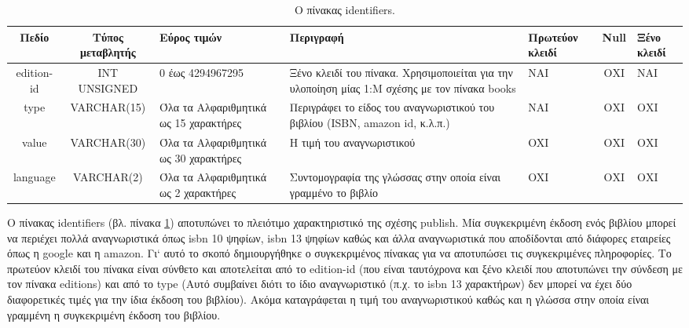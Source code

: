 \documentclass{assignment}
\begin{document}
\begin{landscape}
\begin{table}[htbp]
\begin{center}
  \begin{tabular}{|c|c|m{}|m{}|m{2.0cm}|c|m{1.5cm}|}
    \hline
    {\bf Πεδίο} & {\bf Τύπος μεταβλητής} & {\bf Εύρος τιμών} & {\bf Περιγραφή} & {\bf Πρωτεύον κλειδί} & {\bf Null} & {\bf Ξένο κλειδί} \\ \hline
    edition-id & INT UNSIGNED & 0 έως 4294967295 & Ξένο κλειδί του πίνακα. Χρησιμοποιείται για την υλοποίηση μίας 1:Μ σχέσης με τον πίνακα books & ΝΑΙ & ΟΧΙ & NAI \\ \hline
    type & VARCHAR(15) & Όλα τα Αλφαριθμητικά ως 15 χαρακτήρες & Περιγράφει το είδος του αναγνωριστικού του βιβλίου (ISBN, amazon id, κ.λ.π.)  & ΝΑΙ & ΟΧΙ & ΟΧΙ \\ \hline
    value & VARCHAR(30) & Όλα τα Αλφαριθμητικά ως 30 χαρακτήρες & Η τιμή του αναγνωριστικού  & OXI & ΟΧΙ & ΟΧΙ \\ \hline
    language & VARCHAR(2) & Όλα τα Αλφαριθμητικά ως 2 χαρακτήρες & Συντομογραφία της γλώσσας στην οποία είναι γραμμένο το βιβλίο  & OXI & ΟΧΙ & ΟΧΙ \\ \hline
  \end{tabular}
\caption{Ο πίνακας identifiers.}
\label{table:db_table:identifiers}
\end{center}
\end{table}

Ο πίνακας identifiers (βλ. πίνακα \ref{table:db_table:identifiers}) αποτυπώνει το πλειότιμο χαρακτηριστικό της σχέσης publish. Μία συγκεκριμένη έκδοση ενός βιβλίου μπορεί να περιέχει πολλά αναγνωριστικά όπως isbn 10 ψηφίων, isbn 13 ψηφίων καθώς και άλλα αναγνωριστικά που αποδίδονται από διάφορες εταιρείες όπως η google και η amazon. Γι` αυτό το σκοπό δημιουργήθηκε ο συγκεκριμένος πίνακας για να αποτυπώσει τις συγκεκριμένες πληροφορίες. Το πρωτεύον κλειδί του πίνακα είναι σύνθετο και αποτελείται από το edition-id (που είναι ταυτόχρονα και ξένο κλειδί που αποτυπώνει την σύνδεση με τον πίνακα editions) και από το type (Αυτό συμβαίνει διότι το ίδιο αναγνωριστικό (π.χ. το isbn 13 χαρακτήρων) δεν μπορεί να έχει δύο διαφορετικές τιμές για την ίδια έκδοση του βιβλίου). Ακόμα καταγράφεται η τιμή του αναγνωριστικού καθώς και η γλώσσα στην οποία είναι γραμμένη η συγκεκριμένη έκδοση του βιβλίου.
\end{landscape}
\end{document}
